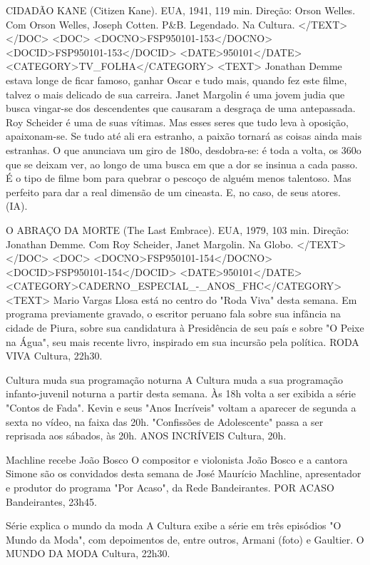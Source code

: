 CIDADÃO KANE (Citizen Kane). EUA, 1941, 119 min. Direção: Orson Welles. Com Orson Welles, Joseph Cotten. P&B. Legendado. Na Cultura.
</TEXT>
</DOC>
<DOC>
<DOCNO>FSP950101-153</DOCNO>
<DOCID>FSP950101-153</DOCID>
<DATE>950101</DATE>
<CATEGORY>TV_FOLHA</CATEGORY>
<TEXT>
Jonathan Demme estava longe de ficar famoso, ganhar Oscar e tudo mais, quando fez este filme, talvez o mais delicado de sua carreira. Janet Margolin é uma jovem judia que busca vingar-se dos descendentes que causaram a desgraça de uma antepassada. Roy Scheider é uma de suas vítimas. Mas esses seres que tudo leva à oposição, apaixonam-se. Se tudo até ali era estranho, a paixão tornará as coisas ainda mais estranhas. O que anunciava um giro de 180o, desdobra-se: é toda a volta, os 360o que se deixam ver, ao longo de uma busca em que a dor se insinua a cada passo. É o tipo de filme bom para quebrar o pescoço de alguém menos talentoso. Mas perfeito para dar a real dimensão de um cineasta. E, no caso, de seus atores. (IA).

O ABRAÇO DA MORTE (The Last Embrace). EUA, 1979, 103 min. Direção: Jonathan Demme. Com Roy Scheider, Janet Margolin. Na Globo.
</TEXT>
</DOC>
<DOC>
<DOCNO>FSP950101-154</DOCNO>
<DOCID>FSP950101-154</DOCID>
<DATE>950101</DATE>
<CATEGORY>CADERNO_ESPECIAL_-_ANOS_FHC</CATEGORY>
<TEXT>
Mario Vargas Llosa está no centro do "Roda Viva" desta semana. Em programa previamente gravado, o escritor peruano fala sobre sua infância na cidade de Piura, sobre sua candidatura à Presidência de seu país e sobre "O Peixe na Água", seu mais recente livro, inspirado em sua incursão pela política.
RODA VIVA  Cultura, 22h30.

Cultura muda sua programação noturna 
A Cultura muda a sua programação infanto-juvenil noturna a partir desta semana. Às 18h volta a ser exibida a série "Contos de Fada". Kevin e seus "Anos Incríveis" voltam a aparecer de segunda a sexta no vídeo, na faixa das 20h. "Confissões de Adolescente" passa a ser reprisada aos sábados, às 20h.
ANOS INCRÍVEIS  Cultura, 20h.

Machline recebe João Bosco 
O compositor e violonista João Bosco e a cantora Simone são os convidados desta semana de José Maurício Machline, apresentador e produtor do programa "Por Acaso", da Rede Bandeirantes.
POR ACASO  Bandeirantes, 23h45.

Série explica o mundo da moda 
A Cultura exibe a série em três episódios "O Mundo da Moda", com depoimentos de, entre outros, Armani (foto) e Gaultier.
O MUNDO DA MODA  Cultura, 22h30.

